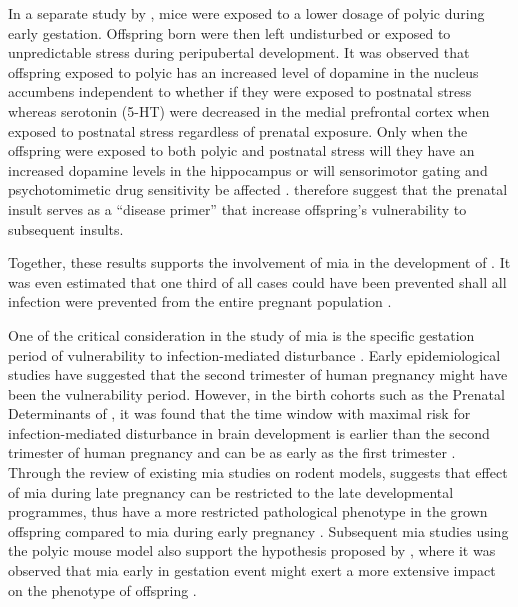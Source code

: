 	In a separate study by \citet{Giovanoli2013}, mice were exposed to a lower dosage of \gls{polyic} during early gestation.
	Offspring born were then left undisturbed or exposed to unpredictable stress during peripubertal development.
	It was observed that offspring exposed to \gls{polyic} has an increased level of dopamine in the nucleus accumbens independent to whether if they were exposed to postnatal stress whereas serotonin (5-HT) were decreased in the medial prefrontal cortex when exposed to postnatal stress regardless of prenatal exposure.
	Only when the offspring were exposed to both \gls{polyic} and postnatal stress will they have an increased dopamine levels in the hippocampus or will sensorimotor gating and psychotomimetic drug sensitivity be affected \citep{Giovanoli2013}.
	\citet{Giovanoli2013} therefore suggest that the prenatal insult serves as a ``disease primer'' that increase offspring's vulnerability to subsequent insults.
	
	Together, these results supports the involvement of \gls{mia} in the development of .
	It was even estimated that one third of all  cases could have been prevented shall all infection were prevented from the entire pregnant population \citep{Brown2010}.
	
	One of the critical consideration in the study of \gls{mia} is the specific gestation period of vulnerability to infection-mediated disturbance \citep{Meyer2007a}.
	Early epidemiological studies have suggested that the second trimester of human pregnancy might have been the vulnerability period.
	However, in the birth cohorts such as the Prenatal Determinants of , it was found that the time window with maximal risk for infection-mediated disturbance in brain development is earlier than the second trimester of human pregnancy and can be as early as the first trimester \citep{Meyer2007a}.
	Through the review of existing \gls{mia} studies on rodent models, \citet{Meyer2007a} suggests that effect of \gls{mia} during late pregnancy can be restricted to the late developmental programmes, thus have a more restricted pathological phenotype in the grown offspring compared to \gls{mia} during early pregnancy \citep{Meyer2007a}.
	Subsequent \gls{mia} studies using the \gls{polyic} mouse model also support the hypothesis proposed by \citet{Meyer2007a}, where it was observed that \gls{mia} early in gestation event might exert a more extensive impact on the phenotype of offspring \citep{Li2009c,Li2010a}.

